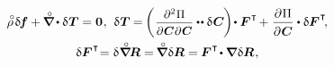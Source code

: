 \begin{otherlanguage}{russian}
\nopagebreak\vspace{-0.05em}\begin{equation}\label{variationsforcurrentconfiguration}
\begin{array}{c}
\mathcircabove{\rho} \hspace{.25ex} \variation{\hspace{-0.2ex}\bm{f}}
+ \hspace{-0.1ex} \boldnablacircled \hspace{-0.12ex} \dotp \variation{\hspace{.1ex}\firstpiolakirchhoffstress}
= \bm{0}
\hspace{.1ex} , \:\,
%
\variation{\hspace{.1ex}\firstpiolakirchhoffstress} \hspace{-0.1ex}
= \hspace{-0.2ex} \left( \hspace{0.1ex} \scalebox{0.92}{$ \displaystyle \frac{\partial^2 \hspace{0.1ex} \Pi}{\raisemath{-0.1em}{\partial \hspace{0.1ex} \bm{C} \hspace{0.1ex} \partial \hspace{0.1ex} \bm{C}}} $} \dotdotp \variation{\hspace{.12ex}\bm{C}} \hspace{-0.16ex} \right) \hspace{-0.32ex} \dotp \bm{F}^{\hspace{.1ex}\T} \hspace{-0.24ex}
+ \hspace{.1ex}
\displaystyle \frac{\partial \hspace{0.1ex} \Pi}{\raisemath{-0.1em}{\partial \hspace{0.1ex} \bm{C}}} \dotp \variation{\bm{F}}^{\hspace{.1ex}\T}
\hspace{-0.4ex} ,
\\[1em]
%
\variation{\bm{F}}^{\hspace{.1ex}\T} \hspace{-0.5ex}
= \variation{\hspace{.1ex} \boldnablacircled \hspace{-0.16ex} \bm{R}}
= \hspace{-0.2ex} \boldnablacircled \hspace{.1ex} \variation{\bm{R}}
= \hspace{-0.12ex} \bm{F}^{\hspace{.1ex}\T} \hspace{-0.25ex} \dotp \boldnabla \hspace{.1ex} \variation{\bm{R}} \hspace{.16ex},

\end{array}
\end{equation}
\end{otherlanguage}
